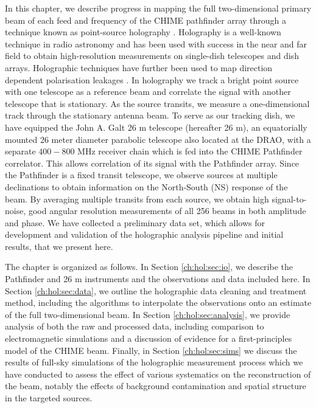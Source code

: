In this chapter, we describe progress in mapping the full two-dimensional primary beam of each feed and frequency of the CHIME pathfinder array through a technique known as point-source holography \citep{radio1, radio2}. Holography is a well-known technique in radio astronomy and has been used with success in the near \citep{hol1} and far field \citep{hol2} to obtain high-resolution measurements on single-dish telescopes and dish arrays. Holographic techniques have further been used to map direction dependent polarisation leakages \citep{holpol}. In holography we track a bright point source with one telescope as a reference beam and correlate the signal with another telescope that is stationary. As the source transits, we measure a one-dimensional track through the stationary antenna beam. To serve as our tracking dish, we have equipped the John A. Galt 26 m telescope\citep{wolleben1, wolleben2} (hereafter 26 m), an equatorially mounted 26 meter diameter parabolic telescope also located at the DRAO, with a separate $400-800$ MHz receiver chain which is fed into the CHIME Pathfinder correlator. This allows correlation of its signal with the Pathfinder array. Since the Pathfinder is a fixed transit telescope, we observe sources at multiple declinations to obtain information on the North-South (NS) response of the beam. By averaging multiple transits from each source, we obtain high signal-to-noise, good angular resolution measurements of all 256 beams in both amplitude and phase. We have collected a preliminary data set, which allows for development and validation of the holographic analysis pipeline and initial results, that we present here.

The chapter is organized as follows. In Section \ref{ch:hol:sec:io}, we describe the Pathfinder and 26 m instruments and the observations and data included here. In Section \ref{ch:hol:sec:data}, we outline the holographic data cleaning and treatment method, including the algorithms to interpolate the observations onto an estimate of the full two-dimensional beam. In Section \ref{ch:hol:sec:analysis}, we provide analysis of both the raw and processed data, including comparison to electromagnetic simulations and a discussion of evidence for a first-principles model of the CHIME beam. Finally, in Section \ref{ch:hol:sec:sims} we discuss the results of full-sky simulations of the holographic measurement process which we have conducted to assess the effect of various systematics on the reconstruction of the beam, notably the effects of background contamination and spatial structure in the targeted sources.


